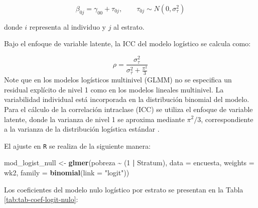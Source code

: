 \documentclass[
  spanish,
  12pt,
]{book}
\newenvironment{Shaded}{\begin{snugshade}}{\end{snugshade}}
\newcommand{\AttributeTok}[1]{\textcolor[rgb]{0.13,0.29,0.53}{#1}}
\newcommand{\DataTypeTok}[1]{\textcolor[rgb]{0.13,0.29,0.53}{#1}}
\newcommand{\DecValTok}[1]{\textcolor[rgb]{0.00,0.00,0.81}{#1}}
\newcommand{\FunctionTok}[1]{\textcolor[rgb]{0.13,0.29,0.53}{\textbf{#1}}}
\newcommand{\NormalTok}[1]{#1}
\newcommand{\OtherTok}[1]{\textcolor[rgb]{0.56,0.35,0.01}{#1}}
\newcommand{\SpecialCharTok}[1]{\textcolor[rgb]{0.81,0.36,0.00}{\textbf{#1}}}
\newcommand{\StringTok}[1]{\textcolor[rgb]{0.31,0.60,0.02}{#1}}
\begin{document}
\[
\beta_{0j} = \gamma_{00} + \tau_{0j}, 
\qquad \tau_{0j} \sim N(0,\sigma_\tau^2)
\]

donde \(i\) representa al individuo y \(j\) al estrato.

Bajo el enfoque de variable latente, la ICC del modelo logístico se calcula como:

\[
\rho = 
\frac{\sigma_\tau^2}
{\sigma_\tau^2 + \frac{\pi^2}{3}}
\]
Note que en los modelos logísticos multinivel (GLMM) no se especifica un residual explícito de nivel 1 como en los modelos lineales multinivel. La variabilidad individual está incorporada en la distribución binomial del modelo. Para el cálculo de la correlación intraclase (ICC) se utiliza el enfoque de variable latente, donde la varianza de nivel 1 se aproxima mediante \(\pi^2/3\), correspondiente a la varianza de la distribución logística estándar \citep{snijders2011}.

El ajuste en \texttt{R} se realiza de la siguiente manera:

\begin{Shaded}
\begin{Highlighting}[]
\NormalTok{mod\_logist\_null }\OtherTok{\textless{}{-}} \FunctionTok{glmer}\NormalTok{(pobreza }\SpecialCharTok{\textasciitilde{}}\NormalTok{ (}\DecValTok{1} \SpecialCharTok{|}\NormalTok{ Stratum),}
                         \AttributeTok{data    =}\NormalTok{ encuesta,}
                         \AttributeTok{weights =}\NormalTok{ wk2,}
                         \AttributeTok{family  =} \FunctionTok{binomial}\NormalTok{(}\AttributeTok{link =} \StringTok{"logit"}\NormalTok{))}
\end{Highlighting}
\end{Shaded}

Los coeficientes del modelo nulo logístico por estrato se presentan en la Tabla \ref{tab:tab-coef-logit-nulo}:

\begin{Shaded}
\end{Shaded}
\end{document}
